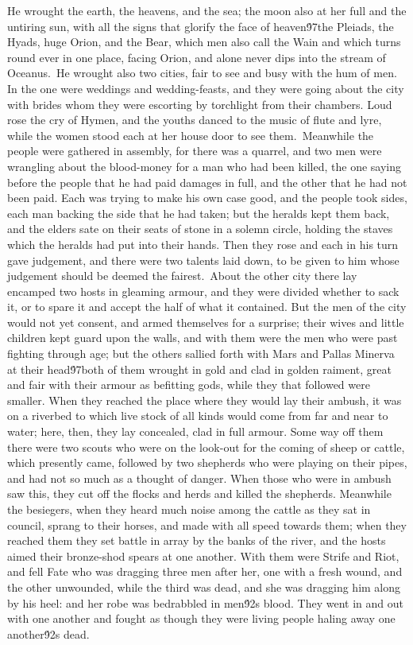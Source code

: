 {He wrought the earth, the heavens, and the sea; the moon also at her full and the untiring sun, with all the signs that glorify the face of heaven\'97the Pleiads, the Hyads, huge Orion, and the Bear, which men also call the Wain and which turns round ever in one place, facing Orion, and alone never dips into the stream of Oceanus.\
He wrought also two cities, fair to see and busy with the hum of men. In the one were weddings and wedding-feasts, and they were going about the city with brides whom they were escorting by torchlight from their chambers. Loud rose the cry of Hymen, and the youths danced to the music of flute and lyre, while the women stood each at her house door to see them.\
Meanwhile the people were gathered in assembly, for there was a quarrel, and two men were wrangling about the blood-money for a man who had been killed, the one saying before the people that he had paid damages in full, and the other that he had not been paid. Each was trying to make his own case good, and the people took sides, each man backing the side that he had taken; but the heralds kept them back, and the elders sate on their seats of stone in a solemn circle, holding the staves which the heralds had put into their hands. Then they rose and each in his turn gave judgement, and there were two talents laid down, to be given to him whose judgement should be deemed the fairest.\
About the other city there lay encamped two hosts in gleaming armour, and they were divided whether to sack it, or to spare it and accept the half of what it contained. But the men of the city would not yet consent, and armed themselves for a surprise; their wives and little children kept guard upon the walls, and with them were the men who were past fighting through age; but the others sallied forth with Mars and Pallas Minerva at their head\'97both of them wrought in gold and clad in golden raiment, great and fair with their armour as befitting gods, while they that followed were smaller. When they reached the place where they would lay their ambush, it was on a riverbed to which live stock of all kinds would come from far and near to water; here, then, they lay concealed, clad in full armour. Some way off them there were two scouts who were on the look-out for the coming of sheep or cattle, which presently came, followed by two shepherds who were playing on their pipes, and had not so much as a thought of danger. When those who were in ambush saw this, they cut off the flocks and herds and killed the shepherds. Meanwhile the besiegers, when they heard much noise among the cattle as they sat in council, sprang to their horses, and made with all speed towards them; when they reached them they set battle in array by the banks of the river, and the hosts aimed their bronze-shod spears at one another. With them were Strife and Riot, and fell Fate who was dragging three men after her, one with a fresh wound, and the other unwounded, while the third was dead, and she was dragging him along by his heel: and her robe was bedrabbled in men\'92s blood. They went in and out with one another and fought as though they were living people haling away one another\'92s dead.\
}
